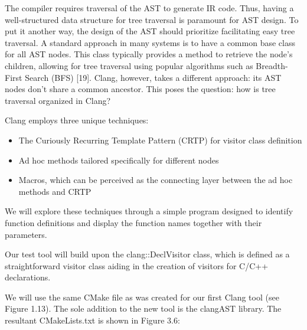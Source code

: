 The compiler requires traversal of the AST to generate IR code. Thus, having a well-structured data structure for tree traversal is paramount for AST design. To put it another way, the design of the AST should prioritize facilitating easy tree traversal. A standard approach in many systems is to have a common base class for all AST nodes. This class typically provides a method to retrieve the node’s children, allowing for tree traversal using popular algorithms such as Breadth-First Search (BFS) [19]. Clang, however, takes a different approach: its AST nodes don’t share a common ancestor. This poses the question: how is tree traversal organized in Clang?

Clang employs three unique techniques:

\begin{itemize}
\item
The Curiously Recurring Template Pattern (CRTP) for visitor class definition

\item
Ad hoc methods tailored specifically for different nodes

\item
Macros, which can be perceived as the connecting layer between the ad hoc methods and CRTP
\end{itemize}

We will explore these techniques through a simple program designed to identify function definitions and display the function names together with their parameters.


Our test tool will build upon the clang::DeclVisitor class, which is defined as a straightforward visitor class aiding in the creation of visitors for C/C++ declarations.

We will use the same CMake file as was created for our first Clang tool (see Figure 1.13). The sole addition to the new tool is the clangAST library. The resultant CMakeLists.txt is shown in Figure 3.6:



